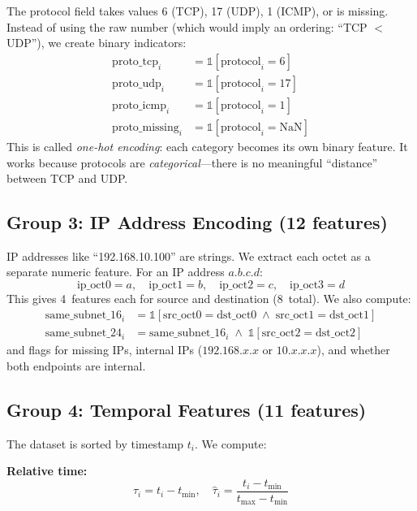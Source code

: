 \documentclass[conference]{IEEEtran}
\begin{document}
The protocol field takes values 6 (TCP), 17 (UDP), 1 (ICMP), or is missing. Instead of using the raw number (which would imply an ordering: ``TCP $<$ UDP''), we create binary indicators:
\begin{align}
    \text{proto\_tcp}_i &= \mathbb{1}[\text{protocol}_i = 6] \\
    \text{proto\_udp}_i &= \mathbb{1}[\text{protocol}_i = 17] \\
    \text{proto\_icmp}_i &= \mathbb{1}[\text{protocol}_i = 1] \\
    \text{proto\_missing}_i &= \mathbb{1}[\text{protocol}_i = \text{NaN}]
\end{align}
This is called \emph{one-hot encoding}: each category becomes its own binary feature. It works because protocols are \emph{categorical}---there is no meaningful ``distance'' between TCP and UDP.

\subsection{Group 3: IP Address Encoding (12 features)}

IP addresses like ``192.168.10.100'' are strings. We extract each octet as a separate numeric feature. For an IP address $a.b.c.d$:
\begin{equation}
    \text{ip\_oct0} = a, \quad \text{ip\_oct1} = b, \quad \text{ip\_oct2} = c, \quad \text{ip\_oct3} = d
\end{equation}
This gives 4~features each for source and destination (8~total). We also compute:
\begin{align}
    \text{same\_subnet\_16}_i &= \mathbb{1}[\text{src\_oct0} = \text{dst\_oct0} \;\wedge\; \text{src\_oct1} = \text{dst\_oct1}] \\
    \text{same\_subnet\_24}_i &= \text{same\_subnet\_16}_i \;\wedge\; \mathbb{1}[\text{src\_oct2} = \text{dst\_oct2}]
\end{align}
and flags for missing IPs, internal IPs ($192.168.x.x$ or $10.x.x.x$), and whether both endpoints are internal.

\subsection{Group 4: Temporal Features (11 features)}

The dataset is sorted by timestamp $t_i$. We compute:

\textbf{Relative time:}
\begin{equation}
    \tau_i = t_i - t_{\min}, \quad \hat{\tau}_i = \frac{t_i - t_{\min}}{t_{\max} - t_{\min}}
\end{equation}
\end{document}
